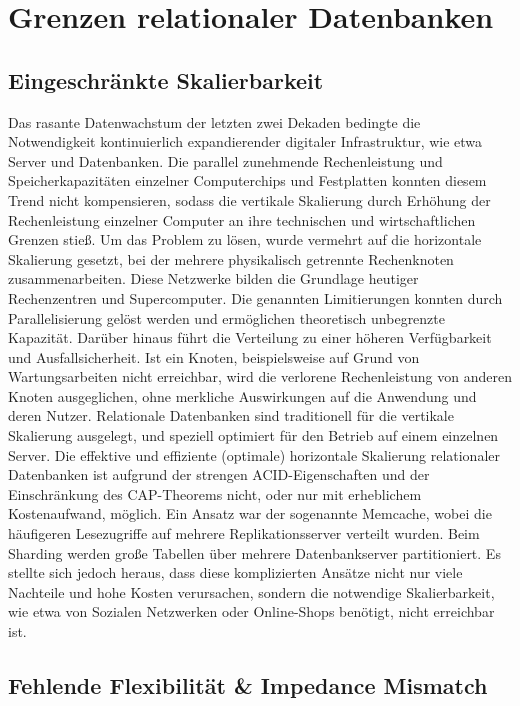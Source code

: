 \section{Grenzen relationaler Datenbanken}



\subsection{Eingeschränkte Skalierbarkeit}

Das rasante Datenwachstum der letzten zwei Dekaden bedingte die Notwendigkeit kontinuierlich expandierender digitaler Infrastruktur, wie etwa Server und Datenbanken. Die parallel zunehmende Rechenleistung und Speicherkapazitäten einzelner Computerchips und Festplatten konnten diesem Trend nicht kompensieren, sodass die vertikale Skalierung durch Erhöhung der Rechenleistung einzelner Computer an ihre technischen und wirtschaftlichen Grenzen stieß. Um das Problem zu lösen, wurde vermehrt auf die horizontale Skalierung gesetzt, bei der mehrere physikalisch getrennte Rechenknoten zusammenarbeiten. Diese Netzwerke bilden die Grundlage heutiger Rechenzentren und Supercomputer. Die genannten Limitierungen konnten durch Parallelisierung gelöst werden und ermöglichen theoretisch unbegrenzte Kapazität. Darüber hinaus führt die Verteilung zu einer höheren Verfügbarkeit und Ausfallsicherheit. Ist ein Knoten, beispielsweise auf Grund von Wartungsarbeiten nicht erreichbar, wird die verlorene Rechenleistung von anderen Knoten ausgeglichen, ohne merkliche Auswirkungen auf die Anwendung und deren Nutzer. Relationale Datenbanken sind traditionell für die vertikale Skalierung ausgelegt, und speziell optimiert für den Betrieb auf einem einzelnen Server. Die effektive und effiziente (optimale) horizontale Skalierung relationaler Datenbanken ist aufgrund der strengen ACID-Eigenschaften und der Einschränkung des CAP-Theorems nicht, oder nur mit erheblichem Kostenaufwand, möglich. Ein Ansatz war der sogenannte Memcache, wobei die häufigeren Lesezugriffe auf mehrere Replikationsserver verteilt wurden. Beim Sharding werden große Tabellen über mehrere Datenbankserver partitioniert. Es stellte sich jedoch heraus, dass diese komplizierten Ansätze nicht nur viele Nachteile und hohe Kosten verursachen, sondern die notwendige Skalierbarkeit, wie etwa von Sozialen Netzwerken oder Online-Shops benötigt, nicht erreichbar ist. \cite[S. 41-43]{harrisonNextGenerationDatabases2015} 

\subsection{Fehlende Flexibilität \& Impedance Mismatch}


